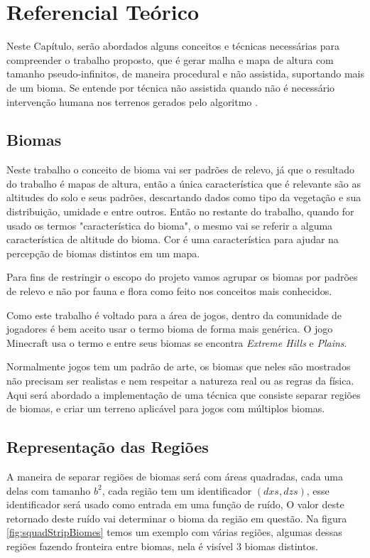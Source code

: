 \chapter{Referencial Teórico}
Neste Capítulo, serão abordados alguns conceitos e técnicas necessárias para
compreender o trabalho proposto, que é 
gerar malha e mapa de altura com tamanho pseudo-infinitos, de maneira procedural
e não assistida, suportando mais de um bioma.
Se entende por técnica não assistida quando não é necessário intervenção humana nos 
terrenos gerados pelo algoritmo \cite{gabrielle2016canion}.

\section{Biomas}
Neste trabalho o conceito de bioma vai ser padrões de relevo, já que o resultado do trabalho
é mapas de altura, então a única característica que é relevante
são as altitudes do solo e seus padrões, descartando dados como tipo da
vegetação e sua distribuição, umidade e entre outros. Então no restante 
do trabalho, quando for usado os termos "característica do bioma", o mesmo vai
se referir a alguma característica de altitude do bioma. Cor é uma característica 
para ajudar na percepção de biomas distintos em um mapa.

Para fins de restringir o escopo do projeto vamos agrupar os biomas por padrões
de relevo e não por fauna e flora como feito nos conceitos mais conhecidos.

Como este trabalho é voltado para a área de jogos, dentro da comunidade de jogadores
é bem aceito usar o termo bioma de forma mais genérica. O jogo Minecraft usa o
termo e entre seus biomas se encontra \textit{Extreme Hills} e \textit{Plains}.

Normalmente jogos tem um padrão de arte, os biomas que neles são mostrados não 
precisam ser realistas e nem respeitar a natureza real ou as regras da física. Aqui será 
abordado a implementação de uma técnica que consiste separar regiões de biomas, e criar
um terreno aplicável para jogos com múltiplos biomas.

\section{Representação das Regiões}
A maneira de separar regiões de biomas será com áreas quadradas, cada uma delas com
tamanho $b^{2}$, cada região tem um identificador $(dxs, dzs)$, esse identificador
será usado como entrada em uma função de ruído, O valor deste retornado deste ruído vai 
determinar o bioma da região em questão. Na figura \ref{fig:squadStripBiomes} temos
um exemplo com várias regiões, algumas dessas regiões fazendo fronteira entre biomas, 
nela é visível 3 biomas distintos.

